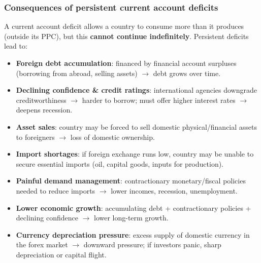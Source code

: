 \subsubsection*{Consequences of persistent current account deficits}
A current account deficit allows a country to consume more than it produces (outside its PPC), but this \textbf{cannot continue indefinitely}. Persistent deficits lead to:
\begin{itemize}
  \item \textbf{Foreign debt accumulation}: financed by financial account surpluses (borrowing from abroad, selling assets) $\to$ debt grows over time.
  \item \textbf{Declining confidence \& credit ratings}: international agencies downgrade creditworthiness $\to$ harder to borrow; must offer higher interest rates $\to$ deepens recession.
  \item \textbf{Asset sales}: country may be forced to sell domestic physical/financial assets to foreigners $\to$ loss of domestic ownership.
  \item \textbf{Import shortages}: if foreign exchange runs low, country may be unable to secure essential imports (oil, capital goods, inputs for production).
  \item \textbf{Painful demand management}: contractionary monetary/fiscal policies needed to reduce imports $\to$ lower incomes, recession, unemployment.
  \item \textbf{Lower economic growth}: accumulating debt + contractionary policies + declining confidence $\to$ lower long-term growth.
  \item \textbf{Currency depreciation pressure}: excess supply of domestic currency in the forex market $\to$ downward pressure; if investors panic, sharp depreciation or capital flight.
\end{itemize}
